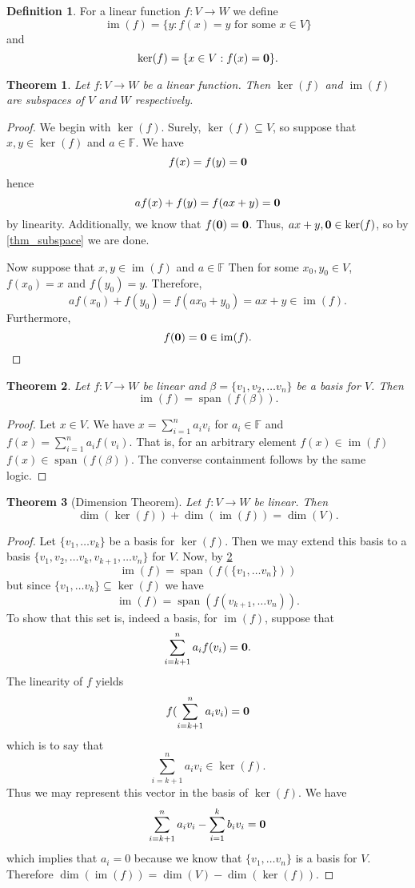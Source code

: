 \documentclass[oneside, 12pt]{book}
\DeclareMathOperator{\spn}{span}
\DeclareMathOperator{\im}{im}
\newtheorem{thm}{Theorem}[section]
\theoremstyle{definition}
\newtheorem{defn}{Definition}[section]
\begin{document}
\begin{defn}
\label{defn_kerim}
For a linear function $f: V \to W$ we define \[ \im(f)=\{y: f(x)=y \text{ for some } x\in V \} \]
and
\[\ker(f)=\{x \in V: f(x)=\bold{0} \}.\]
\end{defn}
\begin{thm}
  \label{thm_kerim}
Let $f: V \to W$ be a linear function. Then $\ker(f)$ and $\im(f)$ are subspaces of $V$ and $W$ respectively.
\end{thm}
\begin{proof}
  We begin with $\ker(f)$. Surely, $\ker(f) \subseteq V$, so suppose that $x,y \in \ker(f)$ and $a \in \mathbb{F}$. We have \[f(x)=f(y)=\bold{0}\] hence \[af(x)+f(y)=f(ax+y)=\bold{0}\] by linearity. Additionally, we know that $f(\bold{0})=\bold{0}$. Thus, $ax+y, \bold{0} \in \ker(f)$, so by \ref{thm_subspace} we are done.

  Now suppose that $x,y \in \im(f)$ and $a \in \mathbb{F}$ Then for some $x_{0},y_{0} \in V$, $f(x_{0})=x$ and $f(y_{0})=y$. Therefore, \[af(x_{0})+f(y_{0})=f(ax_{0}+y_{0})=ax+y \in \im(f).\] Furthermore, \[f(\bold{0})=\bold{0}\in \im(f).\]
\end{proof}
\begin{thm}
  \label{thm_linspan}
Let $f:V \to W$ be linear and $\beta=\{v_{1}, v_{2}, \dots v_{n}\}$ be a basis for $V$. Then \[\im(f)=\spn(f(\beta)).\]

\end{thm}
\begin{proof}
Let $x \in V$. We have $x=\sum\limits_{i=1}^{n}a_{i}v_{i}$ for $a_{i} \in \mathbb{F}$ and $f(x)=\sum\limits_{i=1}^{n}a_{i}f(v_{i})$. That is, for an arbitrary element $f(x) \in \im(f)$ $f(x) \in \spn(f(\beta))$. The converse containment follows by the same logic.
\end{proof}
\begin{thm}[Dimension Theorem]
  \label{thm_dimens}
  Let $f: V \to W$ be linear. Then \[\dim(\ker(f)) + \dim(\im(f))=\dim(V).\]
\end{thm}
\begin{proof}
Let $\{v_{1}, \dots v_{k}\}$ be a basis for $\ker(f)$. Then we may extend this basis to a basis $\{v_{1}, v_{2}, \dots v_{k}, v_{k+1}, \dots v_{n}\}$ for $V$. Now, by \ref{thm_linspan} \[\im(f)=\spn(f(\{v_{1}, \dots v_{n}\}))\] but since $\{v_{1}, \dots v_{k}\} \subseteq \ker(f)$ we have \[\im(f)=\spn(f(v_{k+1}, \dots v_{n})).\] To show that this set is, indeed a basis, for $\im(f)$, suppose that \[\sum_{i=k+1}^{n}a_{i}f(v_{i})=\bold{0}.\] The linearity of $f$ yields \[f(\sum_{i=k+1}^{n}a_{i}v_{i})=\bold{0}\] which is to say that \[\sum_{i=k+1}^{n}a_{i}v_{i} \in \ker(f).\] Thus we may represent this vector in the basis of $\ker(f)$. We have \[\sum_{i=k+1}^{n}a_{i}v_{i}- \sum_{i=1}^{k}b_{i}v_{i}=\bold{0}\] which implies that $a_{i}=0$ because we know that $\{v_{1}, \dots v_{n}\}$ is a basis for $V$. Therefore $\dim(\im(f))=\dim(V)-\dim(\ker(f))$.
\end{proof}
\end{document}
